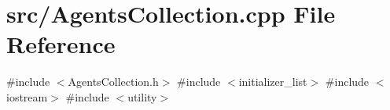 \section{src/\+Agents\+Collection.cpp File Reference}
\label{_agents_collection_8cpp}
{\ttfamily \#include $<$Agents\+Collection.\+h$>$}\newline
{\ttfamily \#include $<$initializer\+\_\+list$>$}\newline
{\ttfamily \#include $<$iostream$>$}\newline
{\ttfamily \#include $<$utility$>$}\newline

